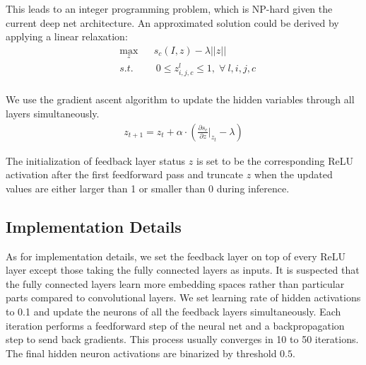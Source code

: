 This leads to an integer programming problem, which is NP-hard given the current deep net architecture. An approximated solution could be derived by applying a linear relaxation:
\begin{equation}
\begin{aligned}
& \max_z & & s_c(I, z) - \lambda ||z|| \\
& s.t. & & \ 0 \leq z^l_{i,j,c} \leq 1, \; \forall\ l, i, j, c\\
\end{aligned}
\end{equation}

We use the gradient ascent algorithm to update the hidden variables through all layers simultaneously.
\begin{equation}
\begin{aligned}
z_{t+1} = z_t + \alpha \cdot (\frac{\partial s_c}{\partial z} |_{z_t} - \lambda)
\end{aligned}
\end{equation}

The initialization of feedback layer status $z$ is set to be the corresponding ReLU activation after the first feedforward pass and truncate $z$ when the updated values are either larger than 1 or smaller than 0 during inference.

\subsection{Implementation Details}
As for implementation details, we set the feedback layer on top of every ReLU layer except those taking the fully connected layers as inputs. It is suspected that the fully connected layers learn more embedding spaces rather than particular parts compared to convolutional layers. We set learning rate of hidden activations to 0.1 and update the neurons of all the feedback layers simultaneously. Each iteration performs a feedforward step of the neural net and a backpropagation step to send back gradients. This process usually converges in 10 to 50 iterations. The final hidden neuron activations are binarized by threshold $0.5$.
